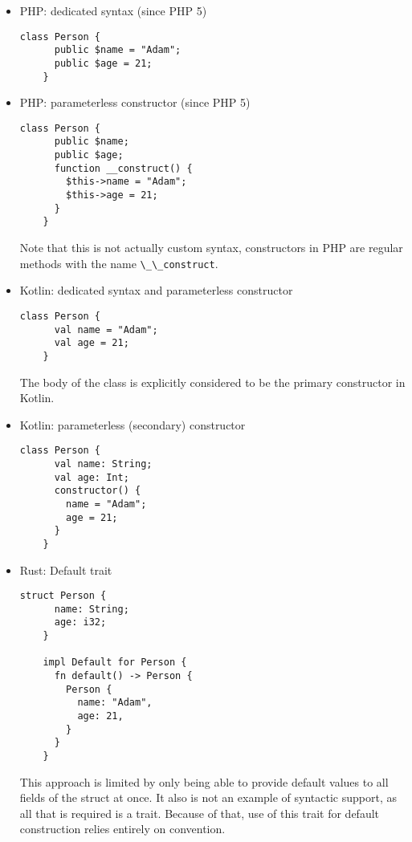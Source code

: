 \documentclass[en]{pracamgr}
\newcommand{\code}[1]{\lstinline[breaklines=true]{#1}}
\begin{document}
\begin{itemize}
\begin{lstlisting}[style=CSharp]
    class Person {
      public String Name;
      public int Age;
      public Person() {
        Name = "Adam";
        Age = 21;
      }
    }
  \end{lstlisting}
  This approach is just manual assignment of values, the only syntactic help is the constructor itself.
  \item PHP: dedicated syntax (since PHP 5)
  \begin{lstlisting}[style=PHP]
    class Person {
      public $name = "Adam";
      public $age = 21;
    }
  \end{lstlisting}
  \item  PHP: parameterless constructor (since PHP 5)
  \begin{lstlisting}[style=PHP]
    class Person {
      public $name;
      public $age;
      function __construct() {
        $this->name = "Adam";
        $this->age = 21;
      }
    }
  \end{lstlisting}
  Note that this is not actually custom syntax, constructors in PHP are regular methods
  with the name \code{\_\_construct}.
  \item Kotlin: dedicated syntax and parameterless constructor
  \begin{lstlisting}[style=Kotlin]
    class Person {
      val name = "Adam";
      val age = 21;
    }
  \end{lstlisting}
  The body of the class is explicitly considered to be the primary constructor in Kotlin.
  \item Kotlin: parameterless (secondary) constructor
  \begin{lstlisting}[style=Kotlin]
    class Person {
      val name: String;
      val age: Int;
      constructor() {
        name = "Adam";
        age = 21;
      }
    }
  \end{lstlisting}
  \item Rust: Default trait
  \begin{lstlisting}[style=Rust]
    struct Person {
      name: String;
      age: i32;
    }

    impl Default for Person {
      fn default() -> Person {
        Person {
          name: "Adam",
          age: 21,
        }
      }
    }
  \end{lstlisting}
  This approach is limited by only being able to provide default values to all fields 
  of the struct at once. It also is not an example of syntactic support, as all that is required is a trait.
  Because of that, use of this trait for default construction relies entirely on convention.
\end{itemize}
\end{document}
